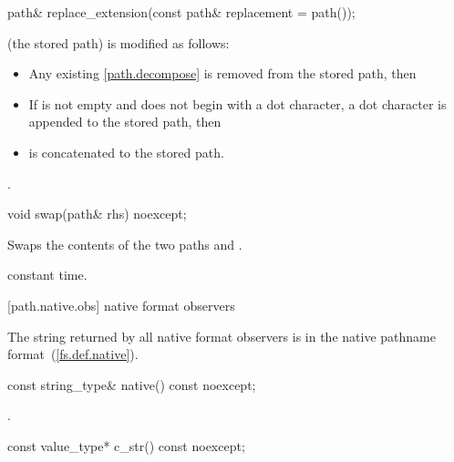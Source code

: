 \begin{itemdecl}
path& replace_extension(const path& replacement = path());
\end{itemdecl}

\begin{itemdescr}
\pnum
\effects {} (the stored path) is modified as follows:
  \begin{itemize}
\item Any existing \ref{path.decompose}\tcode{)} is removed from the stored path,
    then
\item If  is not empty and does not begin with a dot
    character, a dot character is appended to the stored path, then
\item
   is concatenated to the stored path.
  \end{itemize}

\pnum
\returns {}.
\end{itemdescr}

\begin{itemdecl}
void swap(path& rhs) noexcept;
\end{itemdecl}

\begin{itemdescr}
\pnum
\effects Swaps the contents of the two paths  and
.

\pnum
\complexity constant time.
\end{itemdescr}

[path.native.obs]{ native format observers}

\pnum
The string returned by all native format observers is in the native pathname format~(\ref{fs.def.native}).

\begin{itemdecl}
const string_type& native() const noexcept;
\end{itemdecl}

\begin{itemdescr}
\pnum
\returns {}.
\end{itemdescr}

\begin{itemdecl}
const value_type* c_str() const noexcept;
\end{itemdecl}

